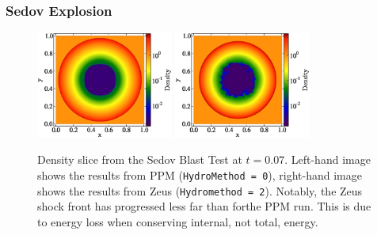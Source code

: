 \subsubsection{Sedov Explosion}
\label{sec.tests.sedov}

\begin{figure}
\begin{center}
\includegraphics[width=0.4\textwidth]{figures/sedov-ppm-slice.eps}
\includegraphics[width=0.4\textwidth]{figures/sedov-zeus-slice.eps}
\caption{Density slice from the Sedov Blast Test at $t =
0.07$. Left-hand image shows the results from PPM ({\tt HydroMethod =
0}), right-hand image shows the results from Zeus ({\tt Hydromethod =
2}). Notably, the Zeus shock front has progressed less far than forthe
PPM run. This is due to energy loss when conserving internal, not
total, energy.}
\label{fig.sedov1}
\end{center}
\end{figure}


